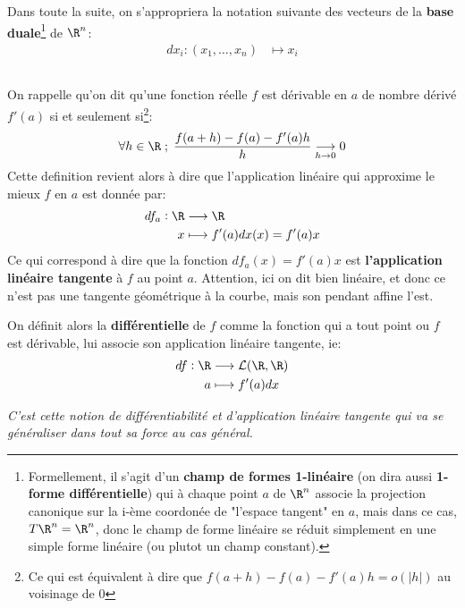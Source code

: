 Dans toute la suite, on s'appropriera la notation suivante des vecteurs de la \textbf{base duale}\footnote[1]{Formellement, il s'agit d'un \textbf{champ de formes 1-linéaire} (on dira aussi \textbf{1-forme différentielle}) qui à chaque point \(a\) de \(\R^n\) associe la projection canonique sur la i-ème coordonée de "l'espace tangent" en \(a\), mais dans ce cas, \(T\R^n = \R^n\), donc le champ de forme linéaire se réduit simplement en une simple forme linéaire (ou plutot un champ constant).} de \(\R^n\):
\[
   \begin{aligned}
      dx_i : (x_1, \ldots, x_n) &\longmapsto x_i 
   \end{aligned}
\]
\subsection*{}
On rappelle qu'on dit qu'une fonction réelle \(f\) est dérivable en \(a\) de nombre dérivé \(f'(a)\) si et seulement si\footnote[2]{Ce qui est équivalent à dire que \(f(a + h) - f(a) - f'(a)h = o(|h|)\) au voisinage de \(0\)}:
\[
   \forall h \in \R \; ; \; \frac{f(a + h) - f(a) - f'(a)h}{h} \underset{h \rightarrow 0}{\longrightarrow} 0
\]
Cette definition revient alors à dire que l'application linéaire qui approxime le mieux \(f\) en \(a\) est donnée par:
\[
   \begin{aligned}
      df_a : \R &\longrightarrow \R\\
      x &\longmapsto f'(a)dx(x) = f'(a)x 
   \end{aligned}  
\]
Ce qui correspond à dire que la fonction \(df_a(x) = f'(a)x\) est \textbf{l'application linéaire tangente} à \(f\) au point \(a\). Attention, ici on dit bien linéaire, et donc ce n'est pas une tangente géométrique à la courbe, mais son pendant affine l'est.\<

On définit alors la \textbf{différentielle} de \(f\) comme la fonction qui a tout point ou \(f\) est dérivable, lui associe son application linéaire tangente, ie:
\[
   \begin{aligned}
      df : \R &\longrightarrow \mathcal{L(\R, \R)}\\
      a &\longmapsto f'(a)dx
   \end{aligned}  
\]
\begin{center}
   \textit{C'est cette notion de différentiabilité et d'application linéaire tangente qui va se généraliser dans tout sa force au cas général.}
\end{center}
